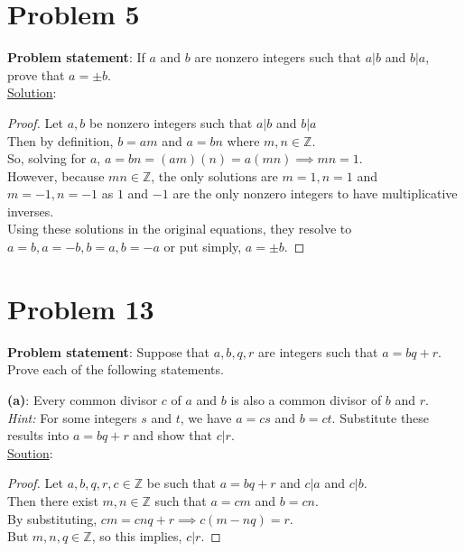 \documentclass{article} %
\begin{document}
\newpage

\section*{Problem 5}


\textbf{Problem statement}: If $a$ and $b$ are nonzero integers such that $a|b$ and $b|a$, prove that $a = \pm b$.
\\

\underline{Solution}: 
\begin{addmargin}[1em]{0em}
\begin{proof}
Let $a, b$ be nonzero integers such that $a|b$ and $b|a$
\\Then by definition, $b = am$ and $a = bn$ where $m,n \in \mathbb{Z}$.
\\So, solving for $a$, $a = bn = (am)(n) = a(mn) \implies mn = 1$.
\\However, because $mn \in \mathbb{Z}$, the only solutions are $m = 1, n = 1$ and $m = -1, n = -1$ as $1$ and $-1$ are the only nonzero integers to have multiplicative inverses.
\\Using these solutions in the original equations, they resolve to $a = b, a = -b, b = a, b = -a$ or put simply, $a = \pm b$.
\end{proof}
\end{addmargin}

\newpage

\section*{Problem 13}


\textbf{Problem statement}: Suppose that $a, b, q, r$ are integers such that $a = bq + r$.  Prove each of the following statements.
\\

\begin{addmargin}[1em]{0em}
\textbf{(a)}: Every common divisor $c$ of $a$ and $b$ is also a common divisor of $b$ and $r$.
\\ \hfill \break
\textit{Hint:} For some integers $s$ and $t$, we have $a = cs$ and $b = ct$.  Substitute these results into $a = bq + r$ and show that $c|r$.
\\ \hfill \break
\underline{Soution}:
\begin{addmargin}[1em]{0em}
\begin{proof}
Let $a, b, q, r, c \in \mathbb{Z}$ be such that $a = bq + r$ and $c|a$ and $c|b$.
\\Then there exist $m, n \in \mathbb{Z}$ such that $a = cm$ and $b = cn$.
\\By substituting, $cm = cnq + r \implies c(m-nq) = r$.
\\But $m,n,q \in \mathbb{Z}$, so this implies, $c|r$.
\end{proof}
\end{addmargin}
\end{addmargin}
\hfill \break
\end{document}
